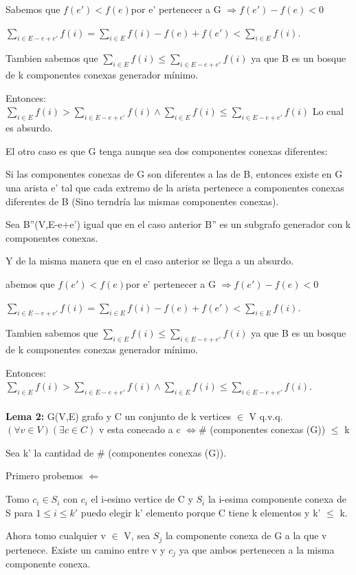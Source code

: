 Sabemos que $f(e') < f(e) $por e' pertenecer a G $\Rightarrow f(e') - f(e) < 0$

$\sum_{i \in E-e+e'} f(i) = \sum_{i \in E} f(i) - f(e) + f(e') < \sum_{i \in E} f(i)$.

Tambien sabemos que $\sum_{i \in E} f(i) \leq \sum_{i \in E-e+e'} f(i)$ ya que B es un bosque de k componentes conexas generador mínimo.

Entonces: $\sum_{i \in E} f(i) > \sum_{i \in E-e+e'} f(i) \wedge \sum_{i \in E} f(i) \leq \sum_{i \in E-e+e'} f(i)$
Lo cual es absurdo.

El otro caso es que G tenga aunque sea dos componentes conexas diferentes:

Si las componentes conexas de G son diferentes a las de B, entonces existe en G una arista e' tal que cada extremo de la arista pertenece a componentes conexas diferentes de B (Sino terndría las mismas componentes conexas).

Sea B''(V,E-e+e') igual que en el caso anterior B'' es un subgrafo generador con k componentes conexas.

Y de la misma manera que en el caso anterior se llega a un absurdo.

abemos que $f(e') < f(e) $por e' pertenecer a G $\Rightarrow f(e') - f(e) < 0$

$\sum_{i \in E-e+e'} f(i) = \sum_{i \in E} f(i) - f(e) + f(e') < \sum_{i \in E} f(i)$.

Tambien sabemos que $\sum_{i \in E} f(i) \leq \sum_{i \in E-e+e'} f(i)$ ya que B es un bosque de k componentes conexas generador mínimo.

Entonces: $\sum_{i \in E} f(i) > \sum_{i \in E-e+e'} f(i) \wedge \sum_{i \in E} f(i) \leq \sum_{i \in E-e+e'} f(i)$. \\ \\


\textbf{Lema 2:} G(V,E) grafo y C un conjunto de k vertices $\in $ V q.v.q. $(\forall v \in V)(\exists c \in C)$ v esta conecado a c $\Leftrightarrow \#$ (componentes conexas (G)) $\leq$ k

Sea k' la cantidad de $\#$ (componentes conexas (G)).

Primero probemos $\Leftarrow$

Tomo $c_i \in S_i$ con $c_i$ el i-esimo vertice de C y $S_i$ la i-esima componente conexa de S para $1 \leq i \leq k'$ puedo elegir k' elemento porque C tiene k elementos y k' $\leq$ k.

Ahora tomo cualquier v $\in$ V, sea $S_j$ la componente conexa de G a la que v pertenece. Existe un camino entre v y $c_j$ ya que ambos pertenecen a la misma componente conexa.

